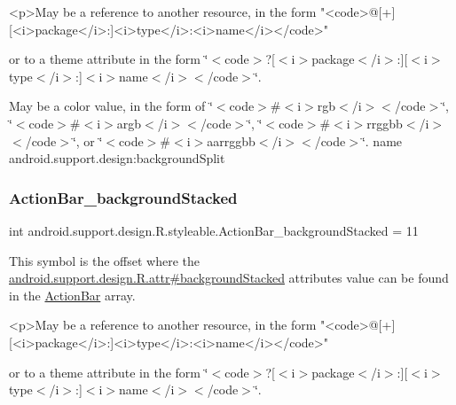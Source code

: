 \begin{DoxyVerb}      <p>May be a reference to another resource, in the form "<code>@[+][<i>package</i>:]<i>type</i>:<i>name</i></code>"
\end{DoxyVerb}
 or to a theme attribute in the form \char`\"{}$<$code$>$?\mbox{[}$<$i$>$package$<$/i$>$\+:\mbox{]}\mbox{[}$<$i$>$type$<$/i$>$\+:\mbox{]}$<$i$>$name$<$/i$>$$<$/code$>$\char`\"{}. 

May be a color value, in the form of \char`\"{}$<$code$>$\#$<$i$>$rgb$<$/i$>$$<$/code$>$\char`\"{}, \char`\"{}$<$code$>$\#$<$i$>$argb$<$/i$>$$<$/code$>$\char`\"{}, \char`\"{}$<$code$>$\#$<$i$>$rrggbb$<$/i$>$$<$/code$>$\char`\"{}, or \char`\"{}$<$code$>$\#$<$i$>$aarrggbb$<$/i$>$$<$/code$>$\char`\"{}.  name android.\+support.\+design\+:background\+Split \mbox{\label{classandroid_1_1support_1_1design_1_1R_1_1styleable_a6efbd40c875995ff58dd2e0851d81c20}} 
\subsubsection{\texorpdfstring{Action\+Bar\+\_\+background\+Stacked}{ActionBar\_backgroundStacked}}
{\footnotesize\ttfamily int android.\+support.\+design.\+R.\+styleable.\+Action\+Bar\+\_\+background\+Stacked = 11\hspace{0.3cm}{\ttfamily [static]}}

This symbol is the offset where the \hyperlink{classandroid_1_1support_1_1design_1_1R_1_1attr_a6b96e24534eaaeeed54585fb284f429e}{android.\+support.\+design.\+R.\+attr\#background\+Stacked} attribute\textquotesingle{}s value can be found in the \hyperlink{classandroid_1_1support_1_1design_1_1R_1_1styleable_ab795220a96557d11f8c21359b95bed82}{Action\+Bar} array.

\begin{DoxyVerb}      <p>May be a reference to another resource, in the form "<code>@[+][<i>package</i>:]<i>type</i>:<i>name</i></code>"
\end{DoxyVerb}
 or to a theme attribute in the form \char`\"{}$<$code$>$?\mbox{[}$<$i$>$package$<$/i$>$\+:\mbox{]}\mbox{[}$<$i$>$type$<$/i$>$\+:\mbox{]}$<$i$>$name$<$/i$>$$<$/code$>$\char`\"{}. 


